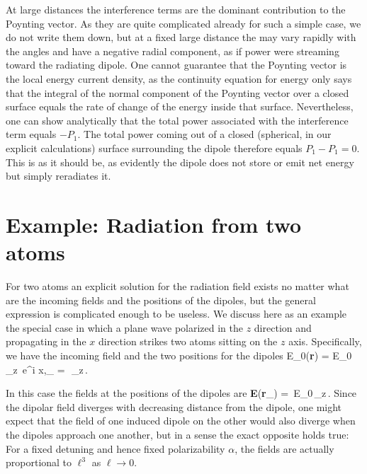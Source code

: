 At large distances the interference terms are the dominant contribution to the Poynting vector. As they are quite complicated already for such a simple case, we do not write them down, but at a fixed large distance the may vary rapidly with the angles and have a negative radial component, as if power were streaming toward the radiating dipole. One cannot guarantee that the Poynting vector is the local energy current density, as the continuity equation for energy only says that the integral of the normal component of the Poynting vector over a closed surface equals the rate of change of the energy inside that surface. Nevertheless, one can  show analytically that the total power associated with the interference term equals $-P_1$. The total power coming  out of a closed (spherical, in our explicit calculations) surface surrounding the dipole therefore equals $P_1-P_1=0$. This is as it should be, as evidently the dipole does not store or emit net energy but simply reradiates it.

\section{Example: Radiation from two atoms}
For two atoms an explicit solution for the radiation field exists no matter what are the incoming fields and the positions of the dipoles, but the general expression is complicated enough to be useless. We discuss here as an example the special case in which a plane wave polarized in the $z$ direction and propagating in the $x$ direction strikes two atoms sitting on the $z$ axis. Specifically, we have the incoming field and the two positions for the dipoles
\beq
E_0({\bf r}) = E_0\, _z\,  e^{i x},_{\pm} = \pm\half\,\ell\,_z\,.
\eeq

In this case the fields at the positions of the dipoles are
\beq
{\bf E}({\bf r}_\pm) = \,E_0\,_z\,.
\label{FOD}
\eeq
Since the dipolar field diverges with decreasing distance from the dipole, one might expect that the field of one induced dipole on the other would also diverge when the dipoles approach one another, but in a sense the exact opposite holds true: For a fixed detuning and hence fixed polarizability $\alpha$, the fields are actually proportional to $\ell^3$ as $\ell\rightarrow0$.

